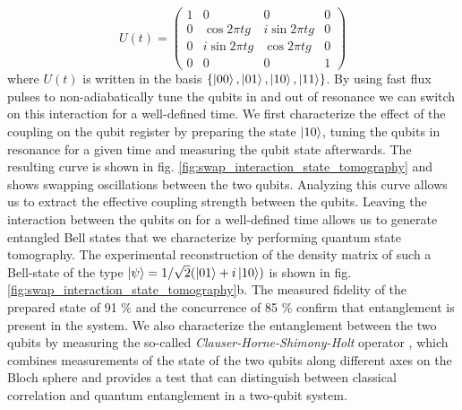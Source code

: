 \begin{equation}
	U(t)  =  \left( \begin{array}{cccc} 1 & 0 & 0 & 0 \\ 0 & \cos{2 \pi t g} & i\sin{2 \pi t g} & 0 \\ 0 & i\sin{2 \pi t g} & \cos{2 \pi t g} & 0 \\ 0 & 0 & 0 & 1 \end{array} \right) \label{eq:swap_evolution_operator}
\end{equation}
 where $U(t)$ is written in the basis $\{\left| 00 \right>,\left| 01 \right>,\left| 10 \right>,\left| 11 \right>\}$. By using fast flux pulses to non-adiabatically tune the qubits in and out of resonance we can switch on this interaction for a well-defined time. We first characterize the effect of the coupling on the qubit register by preparing the state $\left| 10 \right>$, tuning the qubits in resonance for a given time and measuring the  qubit state afterwards. The resulting curve is shown in fig. \ref{fig:swap_interaction_state_tomography} and   shows swapping  oscillations between the two qubits. Analyzing this curve allows us to extract the effective coupling strength between the qubits. Leaving the interaction between the qubits on for a well-defined time allows us to generate entangled Bell states that we characterize by performing quantum state tomography. The experimental reconstruction of the density matrix of such a Bell-state of the type $\left| \psi \right> = 1/\sqrt{2}(\left| 01 \right>+i\left| 10 \right>)$ is shown in fig. \ref{fig:swap_interaction_state_tomography}b. The measured fidelity of the prepared state of 91 \% and the concurrence of 85 \% confirm that entanglement is present in the system. We also characterize the entanglement between the two qubits by measuring the so-called {\it Clauser-Horne-Shimony-Holt} operator \citep{clauser_proposed_1969}, which combines measurements of the state of the two qubits along different axes on the Bloch sphere and provides a test that can distinguish between classical correlation and quantum entanglement in a two-qubit system.

